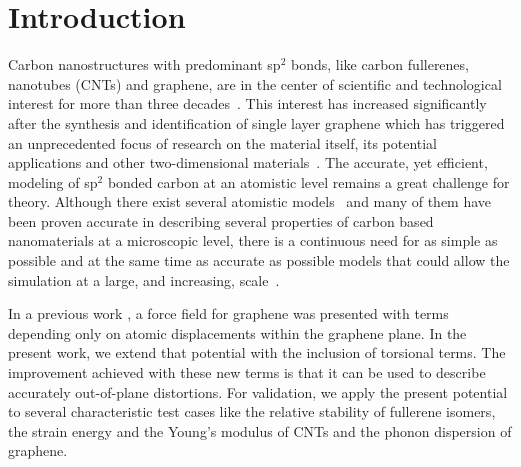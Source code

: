 \documentclass[aps,prb,floatfix,twocolumn,showpacs]{revtex4}
\begin{document}
\section{Introduction}

Carbon nanostructures with predominant sp$^2$ bonds, like carbon fullerenes, nanotubes (CNTs) and graphene,
are in the center of scientific and technological interest for more than three decades~\cite{Kroto,Iijima,Novoselov666}.
This interest has increased significantly after the synthesis and identification of single layer  graphene
which has triggered an unprecedented focus of research on the material itself, its potential applications
and other two-dimensional materials~\cite{CastroNetoRMP,FerrariSSC,C4NR01600A,RuoffAM,GeimGrigorNat,2drevACSnano}.
The accurate, yet efficient, modeling of sp$^2$ bonded carbon at an atomistic level 
remains a great challenge for theory. Although there exist several atomistic 
models~\cite{Tersoff,Tersoff1,T2010,brenner,REAXFF,reaxff_gr,LCBOP,LCBOPII,AIREBO,Wei} 
and many of them have been proven
accurate in describing several properties of carbon based nanomaterials at a microscopic level,
there is a continuous need for as simple as possible and at the same time as accurate as possible models that 
could allow the simulation at a large, and increasing, scale~\cite{FasolinoNatMat,FasolinoPRL,Aluru,Buehler,peeters,arisJPCM,fthen_tomanek,ZhangNatCom,PCCP,yoon,aris2Dmat,meng,jain}. 

In a previous work \cite{kalosakas}, a force field for graphene 
was presented with terms depending only on atomic displacements within the graphene plane.  
In the present work, 
we extend that potential with the inclusion of torsional terms. The improvement 
achieved with these new terms is that it can be used to describe accurately 
out-of-plane distortions. For validation, we apply the present potential to
several characteristic test cases like the relative stability of fullerene isomers, 
the strain energy and the Young's modulus of CNTs and the phonon dispersion of graphene.   
\end{document}
